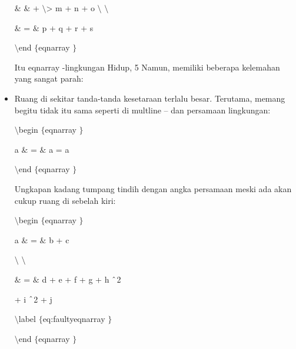 \begin{itemize}
\vspace{12pt}
\noindent 
 $  \&  $ $  \&  $ + $  \setminus  $> m + n + o  $  \setminus  $ $  \setminus  $ \par
\vspace{12pt}
\noindent 
 $  \&  $ =  $  \&  $ p + q + r + s \par
\vspace{12pt}
\noindent 
 $  \setminus  $end $  \{  $eqnarray $  \}  $ \par
\noindent 
\vspace{16pt}
\noindent 
Itu eqnarray -lingkungan Hidup, 5 Namun, memiliki beberapa kelemahan yang sangat parah: \par
\noindent 
\item Ruang di sekitar tanda-tanda kesetaraan terlalu besar. Terutama, memang begitu tidak itu sama seperti di multline – dan persamaan lingkungan: \par
\vspace{12pt}
\noindent 
 $  \setminus  $begin $  \{  $eqnarray $  \}  $ \par
\vspace{12pt}
\noindent 
a  $  \&  $ =  $  \&  $ a = a \par
\vspace{12pt}
\noindent 
 $  \setminus  $end $  \{  $eqnarray $  \}  $ \par
\vspace{12pt}
\noindent 
Ungkapan kadang tumpang tindih dengan angka persamaan meski ada akan cukup ruang di sebelah kiri: \par
\vspace{12pt}
\noindent 
 $  \setminus  $begin $  \{  $eqnarray $  \}  $ \par
\vspace{12pt}
\noindent 
a  $  \&  $ =  $  \&  $ b + c \par
\noindent 
 $  \setminus  $ $  \setminus  $ \par
\vspace{12pt}
\noindent 
 $  \&  $ =  $  \&  $ d + e + f + g + h $  \string^  $2 \par
\vspace{12pt}
\noindent 
+ i $  \string^  $2 + j \par
\vspace{12pt}
\noindent 
 $  \setminus  $label $  \{  $eq:faultyeqnarray $  \}  $ \par
\vspace{12pt}
\noindent 
 $  \setminus  $end $  \{  $eqnarray $  \}  $ \par

\end{itemize}

